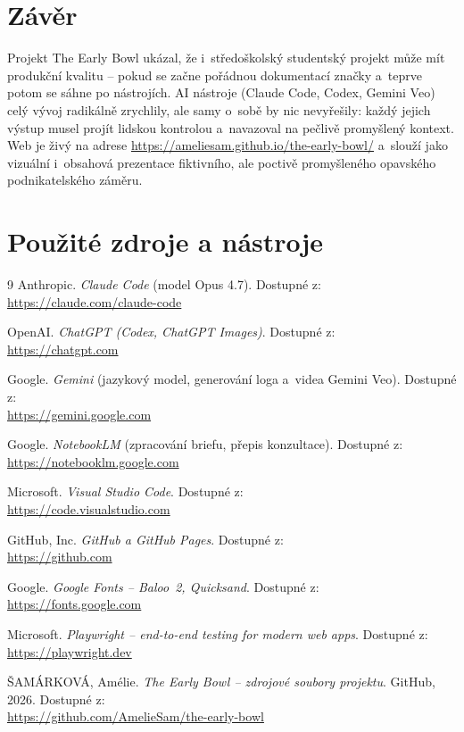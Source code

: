 \documentclass[12pt,a4paper]{article}
\begin{document}
\section*{Závěr}

Projekt The Early Bowl ukázal, že i~středoškolský studentský projekt může mít produkční kvalitu -- pokud se začne pořádnou dokumentací značky a~teprve potom se sáhne po nástrojích. AI nástroje (Claude Code, Codex, Gemini Veo) celý vývoj radikálně zrychlily, ale samy o~sobě by nic nevyřešily: každý jejich výstup musel projít lidskou kontrolou a~navazoval na pečlivě promyšlený kontext. Web je živý na adrese \url{https://ameliesam.github.io/the-early-bowl/} a~slouží jako vizuální i~obsahová prezentace fiktivního, ale poctivě promyšleného opavského podnikatelského záměru.

\section*{Použité zdroje a nástroje}

\begin{thebibliography}{9}
  Anthropic. \textit{Claude Code} (model Opus 4.7). Dostupné z:\\
  \url{https://claude.com/claude-code}

  OpenAI. \textit{ChatGPT (Codex, ChatGPT Images)}. Dostupné z:\\
  \url{https://chatgpt.com}

  Google. \textit{Gemini} (jazykový model, generování loga a~videa Gemini Veo). Dostupné z:\\
  \url{https://gemini.google.com}

  Google. \textit{NotebookLM} (zpracování briefu, přepis konzultace). Dostupné z:\\
  \url{https://notebooklm.google.com}

  Microsoft. \textit{Visual Studio Code}. Dostupné z:\\
  \url{https://code.visualstudio.com}

  GitHub, Inc. \textit{GitHub a GitHub Pages}. Dostupné z:\\
  \url{https://github.com}

  Google. \textit{Google Fonts -- Baloo~2, Quicksand}. Dostupné z:\\
  \url{https://fonts.google.com}

  Microsoft. \textit{Playwright -- end-to-end testing for modern web apps}. Dostupné z:\\
  \url{https://playwright.dev}

  ŠAMÁRKOVÁ, Amélie. \textit{The Early Bowl -- zdrojové soubory projektu}. GitHub, 2026. Dostupné z:\\
  \url{https://github.com/AmelieSam/the-early-bowl}
\end{thebibliography}
\end{document}
